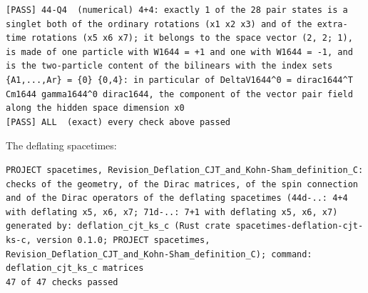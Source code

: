 \documentclass[
  10pt,
]{article}
\begin{document}
\begin{verbatim}
[PASS] 44-Q4  (numerical) 4+4: exactly 1 of the 28 pair states is a singlet both of the ordinary rotations (x1 x2 x3) and of the extra-time rotations (x5 x6 x7); it belongs to the space vector (2, 2; 1), is made of one particle with W1644 = +1 and one with W1644 = -1, and is the two-particle content of the bilinears with the index sets {A1,...,Ar} = {0} {0,4}: in particular of DeltaV1644^0 = dirac1644^T Cm1644 gamma1644^0 dirac1644, the component of the vector pair field along the hidden space dimension x0
[PASS] ALL  (exact) every check above passed
\end{verbatim}

The deflating spacetimes:

\begin{verbatim}
PROJECT spacetimes, Revision_Deflation_CJT_and_Kohn-Sham_definition_C: checks of the geometry, of the Dirac matrices, of the spin connection and of the Dirac operators of the deflating spacetimes (44d-..: 4+4 with deflating x5, x6, x7; 71d-..: 7+1 with deflating x5, x6, x7)
generated by: deflation_cjt_ks_c (Rust crate spacetimes-deflation-cjt-ks-c, version 0.1.0; PROJECT spacetimes, Revision_Deflation_CJT_and_Kohn-Sham_definition_C); command: deflation_cjt_ks_c matrices
47 of 47 checks passed


\end{verbatim}
\end{document}
